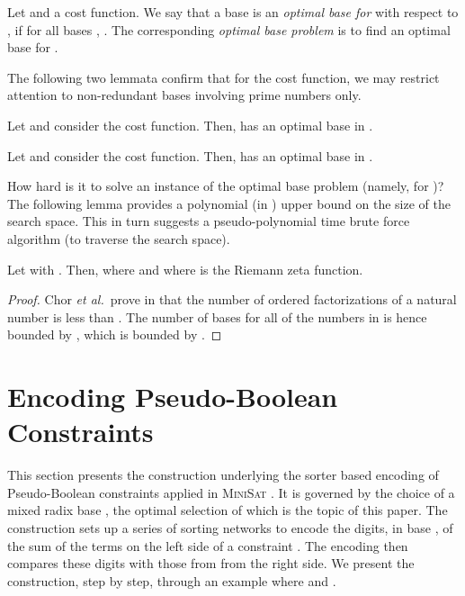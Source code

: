 \documentclass[envcountsame]{llncs}
\newcommand\etal{{\it et al{.}}}
\newcommand\minisatp{\textsc{MiniSat}}
\begin{document}
\begin{definition}
  Let  and  a cost function.  We say that
  a base  is an \emph{optimal base for } with respect to
  , if for all bases , .
  The corresponding \emph{optimal base problem} is to find an optimal
  base  for .
\end{definition}




The following two lemmata confirm that for the  cost
function, we may restrict attention to non-redundant bases involving
prime numbers only.

\begin{lemma}
\label{l1}
   Let  and consider the  cost
   function. Then,  has an optimal base in .
\end{lemma}

\begin{lemma}
\label{lem:primes}
   Let  and consider the  cost
   function. Then,  has an optimal base in .
\end{lemma}


How hard is it to solve an instance of the optimal base problem
(namely, for )? The following lemma provides a
polynomial (in ) upper bound on the size of the search
space. This in turn suggests a pseudo-polynomial time brute force
algorithm (to traverse the search space).

\begin{lemma}\label{zeta}
  Let   with . Then,
   where
   and where  is the Riemann
  zeta function.
\end{lemma}

\begin{proof}
  Chor \etal\ prove in \cite{ChorLM00} that the number of ordered
  factorizations of a natural number  is less than . The
  number of bases for all of the numbers in  is hence bounded by
  , which is bounded by .
\end{proof}


\section{Encoding Pseudo-Boolean Constraints}
\label{sec:encoding}

This section presents the construction underlying the sorter based
encoding of Pseudo-Boolean constraints applied in \minisatp
\cite{EenS06}.  It is governed by the choice of a mixed radix base
, the optimal selection of which is the topic of this paper. 
The construction sets up a series of sorting networks to encode the 
\pagebreak
digits, in base , of the sum of the terms on the left side of a 
constraint . The
encoding then compares these digits with those from  from the
right side.
We present the construction, step by step, through an example where
 and . 
\end{document}

